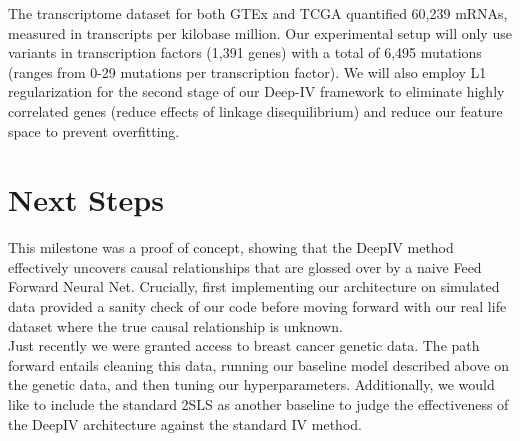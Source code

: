 \documentclass[10.5pt, oneside, twocolumn]{article}   	%
\begin{document}
 The transcriptome dataset for both GTEx and TCGA quantified 60,239 mRNAs, measured in transcripts per kilobase million. Our experimental setup will only use variants in transcription factors (1,391 genes) with a total of 6,495 mutations (ranges from 0-29 mutations per transcription factor). We will also employ L1 regularization for the second stage of our Deep-IV framework to eliminate highly correlated genes (reduce effects of linkage disequilibrium) and reduce our feature space to prevent overfitting.

\section{Next Steps}
This milestone was a proof of concept, showing that the DeepIV method effectively uncovers causal relationships that are glossed over by a naive Feed Forward Neural Net. Crucially, first implementing our architecture on simulated data provided a sanity check of our code before moving forward with our real life dataset where the true causal relationship is unknown.\\

Just recently we were granted access to breast cancer genetic data. The path forward entails cleaning this data, running our baseline model described above on the genetic data, and then tuning our hyperparameters. Additionally, we would like to include the standard 2SLS as another baseline to judge the effectiveness of the DeepIV architecture against the standard IV method. 
\end{document}
